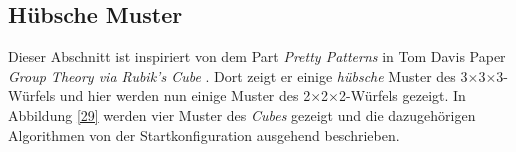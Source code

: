 \documentclass[12pt,a4paper, usenames, dvipsnames]{article}
\newcommand{\Ttwo}{2$\times$2$\times$2-}
\newcommand{\Tthree}{3$\times$3$\times$3-}
\begin{document}
%
%
%
%
%
%
%
%
%
%
%
%
%
%
%
%
%
%
%
\subsection*{Hübsche Muster}
Dieser Abschnitt ist inspiriert von dem Part \textit{Pretty Patterns} in Tom Davis Paper \textit{Group Theory via Rubik's Cube} \cite{TD}.
Dort zeigt er einige \textit{hübsche} Muster des \Tthree Würfels und hier werden nun einige Muster des \Ttwo Würfels gezeigt.
In Abbildung \ref{29} werden vier Muster des \textit{Cubes} gezeigt und die dazugehörigen Algorithmen von der Startkonfiguration ausgehend beschrieben.

\begin{figure}[h]
\centering
\begin{tabular}{cc}

\end{tabular}
\end{figure}
\end{document}
